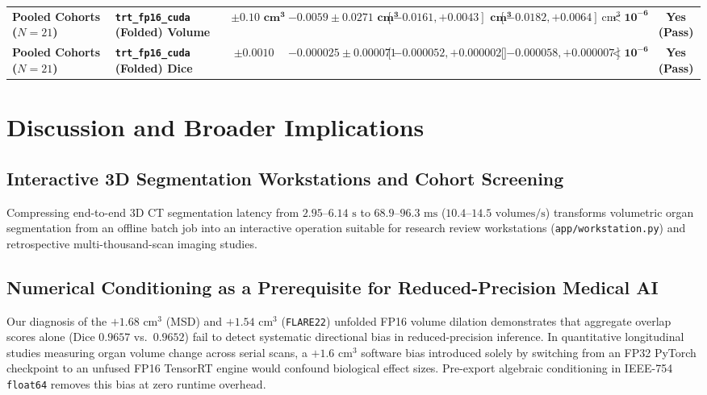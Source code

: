 \documentclass[10pt,twocolumn]{article}
\begin{document}
\begin{table}[t]
{\begin{tabular}{llcccccc}
\textbf{Pooled Cohorts ($N = 21$)} & \textbf{\texttt{trt\_fp16\_cuda} (Folded) Volume} & $\mathbf{\pm 0.10\textbf{ cm}^3}$ & $\mathbf{-0.0059 \pm 0.0271\textbf{ cm}^3}$ & $\mathbf{[-0.0161, +0.0043]\textbf{ cm}^3}$ & $[-0.0182, +0.0064]\text{ cm}^3$ & $\mathbf{< 10^{-6}}$ & \textbf{Yes (Pass)} \\
\textbf{Pooled Cohorts ($N = 21$)} & \textbf{\texttt{trt\_fp16\_cuda} (Folded) Dice} & $\mathbf{\pm 0.0010}$ & $\mathbf{-0.000025 \pm 0.000071}$ & $\mathbf{[-0.000052, +0.000002]}$ & $[-0.000058, +0.000007]$ & $\mathbf{< 10^{-6}}$ & \textbf{Yes (Pass)} \\
\bottomrule
\end{tabular}%
}
\end{table}

\section{Discussion and Broader Implications}
\label{sec:discussion}

\subsection{Interactive 3D Segmentation Workstations and Cohort Screening}
Compressing end-to-end 3D CT segmentation latency from $2.95\text{--}6.14\text{ s}$ to $68.9\text{--}96.3\text{ ms}$ ($10.4\text{--}14.5\text{ volumes/s}$) transforms volumetric organ segmentation from an offline batch job into an interactive operation suitable for research review workstations (\texttt{app/workstation.py}) and retrospective multi-thousand-scan imaging studies.

\subsection{Numerical Conditioning as a Prerequisite for Reduced-Precision Medical AI}
Our diagnosis of the $+1.68\text{ cm}^3$ (MSD) and $+1.54\text{ cm}^3$ (\texttt{FLARE22}) unfolded FP16 volume dilation demonstrates that aggregate overlap scores alone (Dice $0.9657$ vs.\ $0.9652$) fail to detect systematic directional bias in reduced-precision inference. In quantitative longitudinal studies measuring organ volume change across serial scans, a $+1.6\text{ cm}^3$ software bias introduced solely by switching from an FP32 PyTorch checkpoint to an unfused FP16 TensorRT engine would confound biological effect sizes. Pre-export algebraic conditioning in IEEE-754 \texttt{float64} removes this bias at zero runtime overhead.
\end{document}
